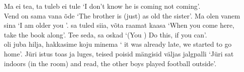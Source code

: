 Ma ei tea,  ta tuleb  ei tule `I don't know  he is coming  not coming'. \\

Vend on sama vana  õde `The brother is (just) as old  the sister'. Ma olen vanem  sina `I am older  you \sing'.  sa tuled siia, võta raamat kaasa `When you \sing come here, take the book along'. Tee seda,  sa oskad `(You \sing) Do this, if
you can'. \\

 oli juba hilja, hakkasime koju minema ` it was already late, we started to go home'. Jüri istus toas ja luges,  teised poisid mängisid väljas jalgpalli `Jüri sat indoors (in the room) and read,  the other boys played football outside'.


\newSection

